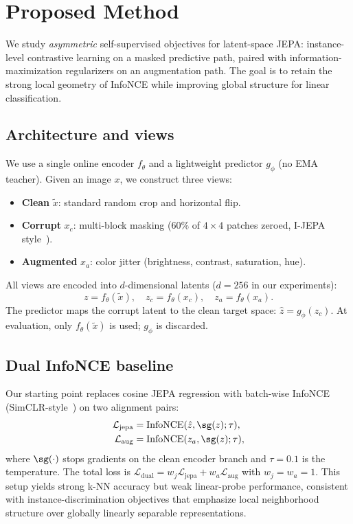 \section{Proposed Method}
\label{sec:method}

We study \emph{asymmetric} self-supervised objectives for latent-space JEPA:
instance-level contrastive learning on a masked predictive path, paired with
information-maximization regularizers on an augmentation path.
The goal is to retain the strong local geometry of InfoNCE while improving
global structure for linear classification.

\subsection{Architecture and views}
\label{sec:architecture}

We use a single online encoder $f_\theta$ and a lightweight predictor
$g_\phi$ (no EMA teacher).
Given an image $x$, we construct three views:
\begin{itemize}
  \item \textbf{Clean} $\tilde{x}$: standard random crop and horizontal flip.
  \item \textbf{Corrupt} $x_c$: multi-block masking ($60\%$ of $4{\times}4$ patches
        zeroed, I-JEPA style~\cite{assran2023ijepa}).
  \item \textbf{Augmented} $x_a$: color jitter (brightness, contrast, saturation, hue).
\end{itemize}
All views are encoded into $d$-dimensional latents ($d{=}256$ in our experiments):
\[
  z = f_\theta(\tilde{x}), \quad
  z_c = f_\theta(x_c), \quad
  z_a = f_\theta(x_a).
\]
The predictor maps the corrupt latent to the clean target space:
$\hat{z} = g_\phi(z_c)$.
At evaluation, only $f_\theta(\tilde{x})$ is used; $g_\phi$ is discarded.

\subsection{Dual InfoNCE baseline}
\label{sec:baseline}

Our starting point replaces cosine JEPA regression with batch-wise InfoNCE
(SimCLR-style~\cite{chen2020simclr}) on two alignment pairs:
\begin{align}
  \mathcal{L}_{\mathrm{jepa}}
  &= \mathrm{InfoNCE}(\hat{z}, \sg(z); \tau), \\
  \mathcal{L}_{\mathrm{aug}}
  &= \mathrm{InfoNCE}(z_a, \sg(z); \tau),
\end{align}
where $\sg(\cdot)$ stops gradients on the clean encoder branch and
$\tau{=}0.1$ is the temperature.
The total loss is
$\mathcal{L}_{\mathrm{dual}} =
 w_j \mathcal{L}_{\mathrm{jepa}} + w_a \mathcal{L}_{\mathrm{aug}}$
with $w_j = w_a = 1$.
This setup yields strong k-NN accuracy but weak linear-probe performance,
consistent with instance-discrimination objectives that emphasize local
neighborhood structure over globally linearly separable representations.

